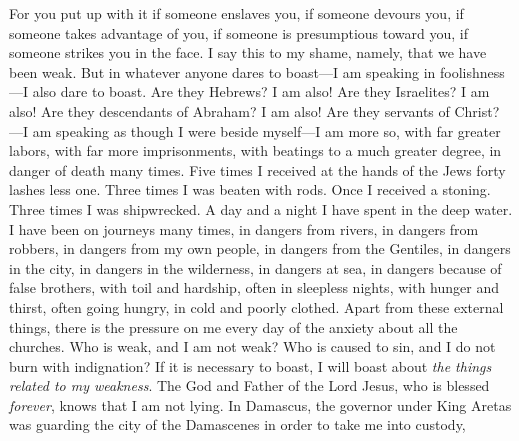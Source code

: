 \begin{biblechapter}
\verse For you put up with it if someone enslaves you, if someone devours you, if someone takes advantage of you, if someone is presumptious toward you, if someone strikes you in the face.
\verse I say this to my shame, namely, that we have been weak.
\verse But in whatever anyone dares to boast—I am speaking in foolishness—I also dare to boast.
\verse Are they Hebrews? I am also! Are they Israelites? I am also! Are they descendants of Abraham? I am also!
\verse Are they servants of Christ?—I am speaking as though I were beside myself—I am more so, with far greater labors, with far more imprisonments, with beatings to a much greater degree, in danger of death many times.
\verse Five times I received at the hands of the Jews forty lashes less one.
\verse Three times I was beaten with rods. Once I received a stoning. Three times I was shipwrecked. A day and a night I have spent in the deep water.
\verse I have been on journeys many times, in dangers from rivers, in dangers from robbers, in dangers from my own people, in dangers from the Gentiles, in dangers in the city, in dangers in the wilderness, in dangers at sea, in dangers because of false brothers,
\verse with toil and hardship, often in sleepless nights, with hunger and thirst, often going hungry, in cold and poorly clothed.
\verse Apart from these external things, there is the pressure on me every day of the anxiety about all the churches.
\verse Who is weak, and I am not weak? Who is caused to sin, and I do not burn with indignation?
\verse If it is necessary to boast, I will boast about \textit{the things related to my weakness}.
\verse The God and Father of the Lord Jesus, who is blessed \textit{forever}, knows that I am not lying.
\verse In Damascus, the governor under King Aretas was guarding the city of the Damascenes in order to take me into custody,
\end{biblechapter}

